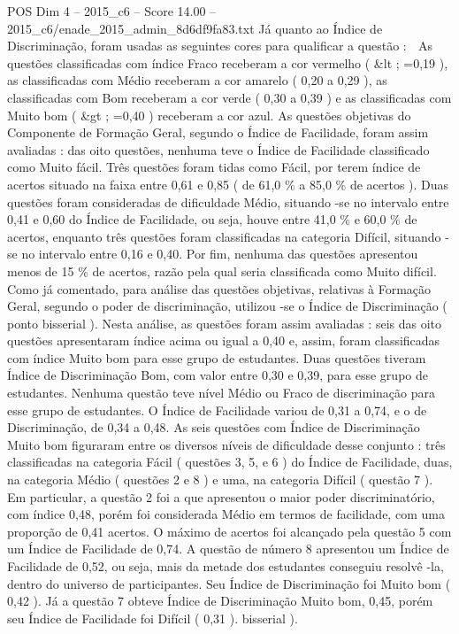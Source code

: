 \begin{textsample}{POS Dim 4 – 2015\_c6 – Score 14.00 – 2015\_c6/enade\_2015\_admin\_8d6df9fa83.txt}
Já quanto ao Índice de Discriminação, foram usadas as seguintes cores para qualificar a questão :  As questões classificadas com índice Fraco receberam a cor vermelho ( \&lt ; =0,19 ), as classificadas com Médio receberam a cor amarelo ( 0,20 a 0,29 ), as classificadas com Bom receberam a cor verde ( 0,30 a 0,39 ) e as classificadas com Muito bom ( \&gt ; =0,40 ) receberam a cor azul.
As questões objetivas do Componente de Formação Geral, segundo o Índice de Facilidade, foram assim avaliadas : das oito questões, nenhuma teve o Índice de Facilidade classificado como Muito fácil.
Três questões foram tidas como Fácil, por terem índice de acertos situado na faixa entre 0,61 e 0,85 ( de 61,0 \% a 85,0 \% de acertos ).
Duas questões foram consideradas de dificuldade Médio, situando -se no intervalo entre 0,41 e 0,60 do Índice de Facilidade, ou seja, houve entre 41,0 \% e 60,0 \% de acertos, enquanto três questões foram classificadas na categoria Difícil, situando -se no intervalo entre 0,16 e 0,40.
Por fim, nenhuma das questões apresentou menos de 15 \% de acertos, razão pela qual seria classificada como Muito difícil.
Como já comentado, para análise das questões objetivas, relativas à Formação Geral, segundo o poder de discriminação, utilizou -se o Índice de Discriminação ( ponto bisserial ).
Nesta análise, as questões foram assim avaliadas : seis das oito questões apresentaram índice acima ou igual a 0,40 e, assim, foram classificadas com índice Muito bom para esse grupo de estudantes.
Duas questões tiveram Índice de Discriminação Bom, com valor entre 0,30 e 0,39, para esse grupo de estudantes.
Nenhuma questão teve nível Médio ou Fraco de discriminação para esse grupo de estudantes.
O Índice de Facilidade variou de 0,31 a 0,74, e o de Discriminação, de 0,34 a 0,48.
As seis questões com Índice de Discriminação Muito bom figuraram entre os diversos níveis de dificuldade desse conjunto : três classificadas na categoria Fácil ( questões 3, 5, e 6 ) do Índice de Facilidade, duas, na categoria Médio ( questões 2 e 8 ) e uma, na categoria Difícil ( questão 7 ).
Em particular, a questão 2 foi a que apresentou o maior poder discriminatório, com índice 0,48, porém foi considerada Médio em termos de facilidade, com uma proporção de 0,41 acertos.
O máximo de acertos foi alcançado pela questão 5 com um Índice de Facilidade de 0,74.
A questão de número 8 apresentou um Índice de Facilidade de 0,52, ou seja, mais da metade dos estudantes conseguiu resolvê -la, dentro do universo de participantes.
Seu Índice de Discriminação foi Muito bom ( 0,42 ).
Já a questão 7 obteve Índice de Discriminação Muito bom, 0,45, porém seu Índice de Facilidade foi Difícil ( 0,31 ). bisserial ).

\end{textsample}
